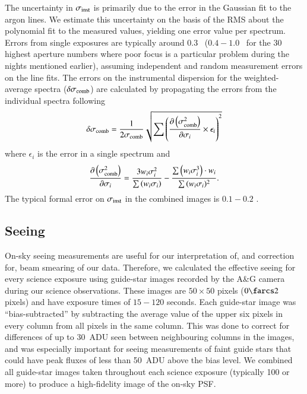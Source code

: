 \documentclass[traditabstract]{aa} %
\begin{document}
The uncertainty in $\sigma_{\rm inst}$ is primarily due to the error in the Gaussian fit to
the argon lines. We estimate this uncertainty on the basis of the RMS about the
polynomial fit to the measured values, yielding one error value per spectrum.
Errors from single exposures are typically around 0.3 \kms\ ($0.4-1.0$ \kms\ for
the 30 highest aperture numbers where poor focus is a particular problem during
the nights mentioned earlier), assuming independent and random measurement
errors on the line fits. The errors on the instrumental dispersion for the
weighted-average spectra ($\delta\sigma_{\rm comb}$) are calculated by
propagating the errors from the individual spectra following
%
\begin{equation}
%
\delta\sigma_{\rm comb}= \frac{1}{2\sigma_{\rm comb}} \sqrt { \sum{ \left(
\frac{\partial\left(\sigma_{\rm comb}^2\right)}{\partial \sigma_i} \times
\epsilon_i \right)^2} }
%
\label{eq:sigmaInst_error}
%
\end{equation}
%
where $\epsilon_i$ is the error in a single spectrum and
%
\begin{equation}
%
\frac{\partial\left(\sigma_{\rm comb}^2\right)}{\partial \sigma_i} =
\frac{3w_i\sigma_i^2}{\sum{\left(w_i\sigma_i\right)}} - \frac{\sum{\left(
w_i\sigma_i^3\right)}\cdot w_i}{\sum{(w_i\sigma_i})^2}.
%
\label{eq:error_derivative}
%
\end{equation}
%
The typical formal error on $\sigma_{\rm inst}$ in the combined images
is $0.1-0.2$ \kms.


\subsection{Seeing}
\label{sec:Seeing}

On-sky seeing measurements are useful for our interpretation of, and correction
for, beam smearing of our data.  Therefore, we calculated the effective seeing
for every science exposure using guide-star images recorded by the A\&G camera
during our science observations.  These images are $50\times50$ pixels
($0\farcs2$ pixels) and have exposure times of $15-120$ seconds.  Each
guide-star image was ``bias-subtracted'' by subtracting the average value of the
upper six pixels in every column from all pixels in the same column.  This was
done to correct for differences of up to 30~ADU seen between neighbouring
columns in the images, and was especially important for seeing measurements of
faint guide stars that could have peak fluxes of less than 50~ADU above the bias
level.  We combined all guide-star images taken throughout each science exposure
(typically 100 or more) to produce a high-fidelity image of the on-sky PSF.
\end{document}
